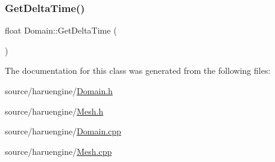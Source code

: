\mbox{\label{class_domain_a595099f01805b1c9975a4d20be49e995}} 
\subsubsection{\texorpdfstring{Get\+Delta\+Time()}{GetDeltaTime()}\hspace{0.1cm}{\footnotesize\ttfamily [2/2]}}
{\footnotesize\ttfamily float Domain\+::\+Get\+Delta\+Time (\begin{DoxyParamCaption}{ }\end{DoxyParamCaption})}



The documentation for this class was generated from the following files\+:\begin{DoxyCompactItemize}
\item 
source/haruengine/\mbox{\hyperlink{_domain_8h}{Domain.\+h}}\item 
source/haruengine/\mbox{\hyperlink{_mesh_8h}{Mesh.\+h}}\item 
source/haruengine/\mbox{\hyperlink{_domain_8cpp}{Domain.\+cpp}}\item 
source/haruengine/\mbox{\hyperlink{_mesh_8cpp}{Mesh.\+cpp}}\end{DoxyCompactItemize}
